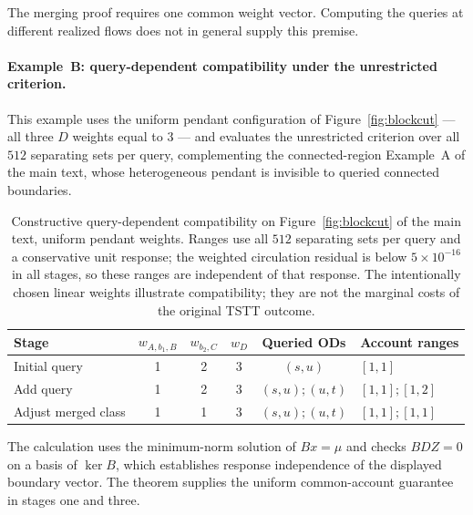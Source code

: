 \begin{rmk}\label{rmk:quantifier}
The merging proof requires one common weight vector. Computing the
queries at different realized flows does not in general supply this
premise.
\end{rmk}

\paragraph{Example~B: query-dependent compatibility under the
unrestricted criterion.}
This example uses the uniform pendant configuration of
Figure~\ref{fig:blockcut} --- all three $D$ weights equal to $3$ ---
and evaluates the unrestricted criterion over all $512$ separating sets
per query, complementing the connected-region Example~A of the main
text, whose heterogeneous pendant is invisible to queried connected
boundaries.
\begin{table}[pos=tb]
\footnotesize
\caption{Constructive query-dependent compatibility on Figure~\ref{fig:blockcut}
of the main text, uniform pendant weights. Ranges use all $512$
separating sets per query and a
conservative unit response; the weighted circulation residual is below
$5\times10^{-16}$ in all stages, so these ranges are independent of that
response. The intentionally chosen linear weights illustrate
compatibility; they are not the marginal costs of the original TSTT
outcome.}\label{tab:topologyexample}
\begin{tabular*}{\tblwidth}{@{\extracolsep{\fill}}lccccl}
\toprule Stage & $w_{A,b_1,B}$ & $w_{b_2,C}$ & $w_D$ & Queried ODs & Account ranges\\\midrule
Initial query & 1 & 2 & 3 & $(s,u)$ & $[1,1]$\\
Add query & 1 & 2 & 3 & $(s,u);(u,t)$ & $[1,1];[1,2]$\\
Adjust merged class & 1 & 1 & 3 & $(s,u);(u,t)$ & $[1,1];[1,1]$\\
\bottomrule\end{tabular*}\end{table}
The calculation uses the minimum-norm solution of $Bx=\mu$ and checks
$BDZ=0$ on a basis of $\ker B$, which establishes response independence
of the displayed boundary vector. The theorem supplies the uniform
common-account guarantee in stages one and three.

